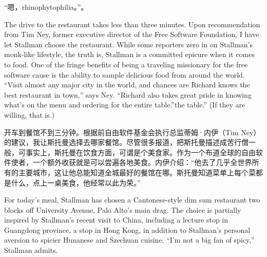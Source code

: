 \ifdefined\chs
``嗯，rhinophytophilia。''\ifdefined\vone{}。\ifdefined\vtwo{}\fi
\fi

\ifdefined\eng
The drive to the restaurant takes less than three minutes. Upon recommendation from Tim Ney, former executive director of the Free Software Foundation, I have let Stallman choose the restaurant. While some reporters zero in on Stallman's monk-like lifestyle, the truth is, Stallman is a committed epicure when it comes to food. One of the fringe benefits of being a traveling missionary for the free software cause is the ability to sample delicious food from around the world. ``Visit almost any major city in the world, and chances are Richard knows the best restaurant in town,'' says Ney. ``Richard also takes great pride in knowing what's on the menu and ordering for the entire \ifdefined\vone table.''\fi\ifdefined\vtwo the table.''  (If they are willing, that is.)\fi
\fi

\ifdefined\chs
开车到餐馆不到三分钟。根据前自由软件基金会执行总监蒂姆·内伊（Tim Ney）的建议，我让斯托曼选择去哪家餐馆。尽管很多报道，把斯托曼描述成苦行僧一般，可事实上，斯托曼在饮食方面，可谓是个美食家。作为一个布道全球的自由软件使者，一个额外收获就是可以尝遍各地美食。内伊介绍：``他去了几乎全世界所有的主要城市，这让他总能知道全城最好的餐馆在哪。斯托曼知道菜单上每个菜都是什么，点上一桌美食，他经常以此为荣。''
\fi

\ifdefined\eng
For today's meal, Stallman has chosen a Cantonese-style dim sum restaurant two blocks off University Avenue, Palo Alto's main drag. The choice is partially inspired by Stallman's recent visit to China, including \ifdefined\vone a lecture stop in Guangdong province, \fi\ifdefined\vtwo a stop in Hong Kong, \fi in addition to Stallman's personal aversion to spicier Hunanese and Szechuan cuisine. ``I'm not a big fan of spicy,'' Stallman admits.
\fi

